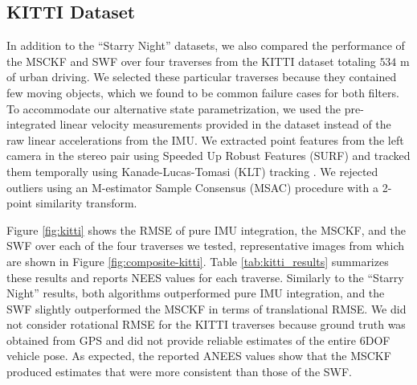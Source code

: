 \documentclass[letterpaper, 10 pt, conference]{ieeeconf}  %
\begin{document}
\subsection{KITTI Dataset}
In addition to the ``Starry Night'' datasets, we also compared the performance of the MSCKF and SWF over four traverses from the KITTI dataset \cite{Geiger:2013:IJRR} totaling $534$ m of urban driving.
We selected these particular traverses because they contained few moving objects, which we found to be common failure cases for both filters.
To accommodate our alternative state parametrization, we used the pre-integrated linear velocity measurements provided in the dataset instead of the raw linear accelerations from the IMU. 
We extracted point features from the left camera in the stereo pair using Speeded Up Robust Features (SURF) \cite{Bay:2008:CVIU} and tracked them temporally using Kanade-Lucas-Tomasi (KLT) tracking \cite{Tomasi:91}.
We rejected outliers using an M-estimator Sample Consensus (MSAC) \cite{TorrZisserman:1998} procedure with a 2-point similarity transform.

Figure \ref{fig:kitti} shows the RMSE of pure IMU integration, the MSCKF, and the SWF over each of the four traverses we tested, representative images from which are shown in Figure \ref{fig:composite-kitti}.
Table \ref{tab:kitti_results} summarizes these results and reports NEES values for each traverse.
Similarly to the ``Starry Night'' results, both algorithms outperformed pure IMU integration, and the SWF slightly outperformed the MSCKF in terms of translational RMSE.
We did not consider rotational RMSE for the KITTI traverses because ground truth was obtained from GPS and did not provide reliable estimates of the entire 6DOF vehicle pose.
As expected, the reported ANEES values show that the MSCKF produced estimates that were more consistent than those of the SWF.
\end{document}
